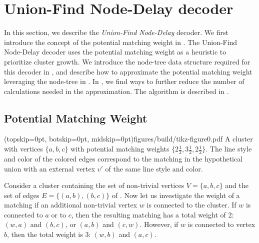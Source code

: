 \section{Union-Find Node-Delay decoder}\label{sec:ufbb}
In this section, we describe the \emph{Union-Find Node-Delay} decoder. We first introduce the concept of the potential matching weight in . The Union-Find Node-Delay decoder uses the potential matching weight as a heuristic to prioritize cluster growth. We introduce the node-tree data structure required for this decoder in , and describe how to approximate the potential matching weight leveraging the node-tree in . In , we find ways to further reduce the number of calculations needed in the approximation. The algorithm is described in . 

\subsection{Potential Matching Weight}\label{sec:matchingweight}

\Figure[htb](topskip=0pt, botskip=0pt, midskip=0pt){figures/build/tikz-figure0.pdf}{
    A cluster with vertices $\{a,b,c\}$ with potential matching weights $\{2\frac{1}{2}, 3\frac{1}{2}, 2\frac{1}{2}\}$. The line style and color of the colored edges correspond to the matching in the hypothetical union with an external vertex $v'$ of the same line style and color.\label{fig0}}


Consider a cluster containing the set of non-trivial vertices $V=\{a,b,c\}$ and the set of edges $E=\{(a,b), (b, c)\}$ of . Now let us investigate the weight of a matching if an additional non-trivial vertex $w$ is connected to the cluster. If $w$ is connected to $a$ or to $c$, then the resulting matching has a total weight of 2: $(w,a)$ and $(b,c)$, or $(a,b)$ and $(c,w)$. However, if $w$ is connected to vertex $b$, then the total weight is 3: $(w, b)$ and $(a, c)$. %

